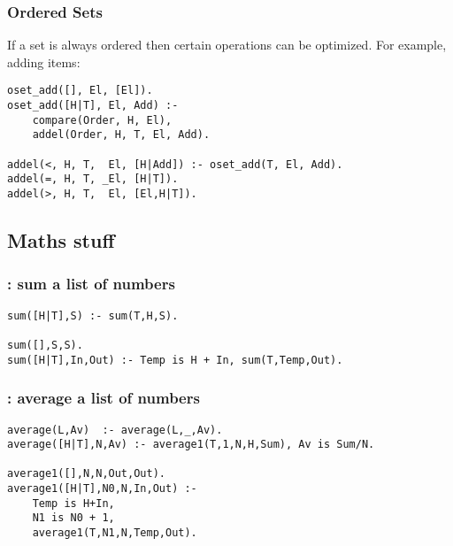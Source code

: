 \subsubsection{ Ordered Sets
}
\label{sec:orderedSets}
If a set is always ordered then certain operations can be optimized.
For example, adding items:
\begin{Verbatim}
oset_add([], El, [El]). 
oset_add([H|T], El, Add) :-
    compare(Order, H, El),
    addel(Order, H, T, El, Add).

addel(<, H, T,  El, [H|Add]) :- oset_add(T, El, Add).
addel(=, H, T, _El, [H|T]). 
addel(>, H, T,  El, [El,H|T]).
\end{Verbatim}
\subsection{ Maths stuff 
}
\label{sec:maths}
\subsubsection{ : sum a list of numbers }\begin{Verbatim}
sum([H|T],S) :- sum(T,H,S).

sum([],S,S).
sum([H|T],In,Out) :- Temp is H + In, sum(T,Temp,Out).
\end{Verbatim}
\subsubsection{ : average a list of numbers }\begin{Verbatim}
average(L,Av)  :- average(L,_,Av).
average([H|T],N,Av) :- average1(T,1,N,H,Sum), Av is Sum/N.

average1([],N,N,Out,Out).
average1([H|T],N0,N,In,Out) :-
    Temp is H+In,
    N1 is N0 + 1,
    average1(T,N1,N,Temp,Out).
\end{Verbatim}
